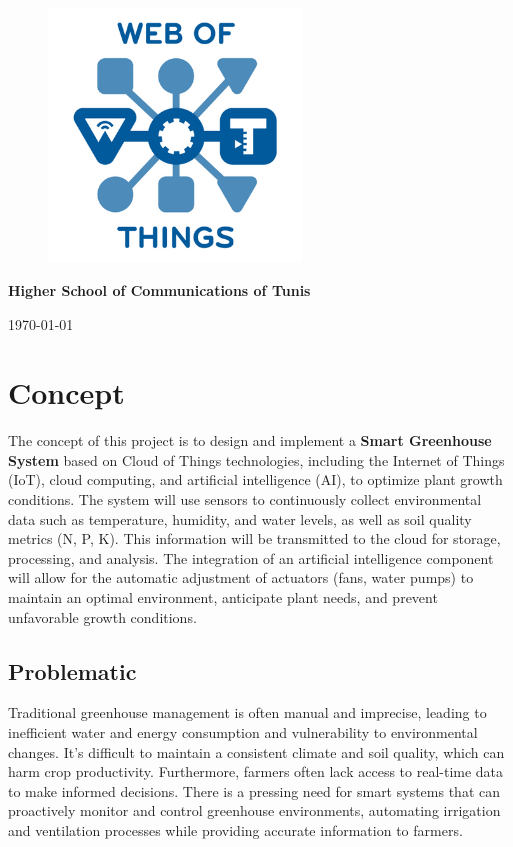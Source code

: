 \documentclass{report}
\begin{document}
\begin{titlepage}
\begin{figure}[H]
    \centering
    \includegraphics[width=0.6\textwidth]{images/webofthings.png}
\end{figure}

\vfill
{\Large \textbf{Higher School of Communications of Tunis} \par}
\vspace{1cm}
{\large \today \par}
\end{titlepage}

\tableofcontents
\cleardoublepage %

\chapter{Concept}
The concept of this project is to design and implement a \textbf{Smart Greenhouse System} based on Cloud of Things technologies, including the Internet of Things (IoT), cloud computing, and artificial intelligence (AI), to optimize plant growth conditions. The system will use sensors to continuously collect environmental data such as temperature, humidity, and water levels, as well as soil quality metrics (N, P, K). This information will be transmitted to the cloud for storage, processing, and analysis. The integration of an artificial intelligence component will allow for the automatic adjustment of actuators (fans, water pumps) to maintain an optimal environment, anticipate plant needs, and prevent unfavorable growth conditions.

\section{Problematic}
Traditional greenhouse management is often manual and imprecise, leading to inefficient water and energy consumption and vulnerability to environmental changes. It's difficult to maintain a consistent climate and soil quality, which can harm crop productivity. Furthermore, farmers often lack access to real-time data to make informed decisions. There is a pressing need for smart systems that can proactively monitor and control greenhouse environments, automating irrigation and ventilation processes while providing accurate information to farmers.
\end{document}
